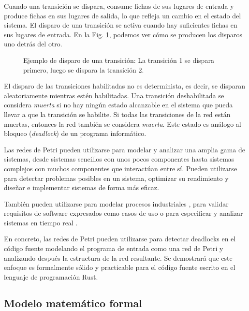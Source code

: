 Cuando una transición se dispara, consume fichas de sus lugares de entrada y produce fichas en
sus lugares de salida, lo que refleja un cambio en el estado del sistema. El disparo de una
transición se activa cuando hay suficientes fichas en sus lugares de entrada.
En la Fig. \ref{fig:petri-net-transition-example},
podemos ver cómo se producen los disparos uno detrás del otro.

\begin{figure}[!htb]
      \centering
      
      \caption{Ejemplo de disparo de una transición:
            La transición 1 se dispara primero, luego se dispara la transición 2.}
      \label{fig:petri-net-transition-example}
\end{figure}

El disparo de las transiciones habilitadas no es determinista, es decir, se disparan
aleatoriamente mientras estén habilitadas.
Una transición deshabilitada se considera \emph{muerta} si
no hay ningún estado alcanzable en el sistema que pueda llevar a que la transición se habilite.
Si todas las transiciones de la red están muertas, entonces la red también se considera \emph{muerta}.
Este estado es análogo al bloqueo (\textit{deadlock}) de un programa informático.

Las redes de Petri pueden utilizarse para modelar y analizar una amplia gama de sistemas,
desde sistemas sencillos con unos pocos componentes hasta sistemas complejos con muchos
componentes que interactúan entre sí. Pueden utilizarse para detectar problemas posibles en
un sistema, optimizar su rendimiento y diseñar e implementar sistemas de forma más eficaz.

También pueden utilizarse para modelar procesos industriales \cite{aalst1994putting}, para
validar requisitos de software expresados como casos de uso \cite{silva2004applying} o para
especificar y analizar sistemas en tiempo real \cite{kavi1996specification}.

En concreto, las redes de Petri pueden utilizarse para detectar deadlocks en el código fuente
modelando el programa de entrada como una red de Petri y analizando después la estructura de
la red resultante. Se demostrará que este enfoque es formalmente sólido y practicable para el
código fuente escrito en el lenguaje de programación Rust.

\subsection{Modelo matemático formal}

